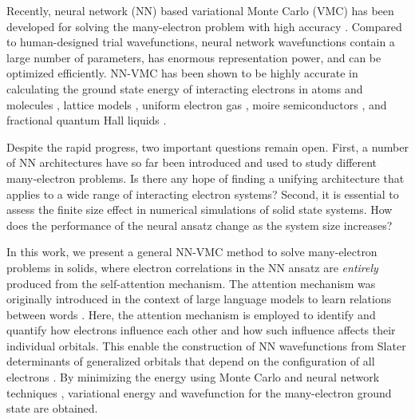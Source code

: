 \documentclass[
 reprint,
 amsmath,amssymb,
 aps, prx,
floatfix,longbibliography,
]{revtex4-2}
\begin{document}
Recently, neural network (NN) based variational Monte Carlo (VMC) has been developed for solving the many-electron problem with high accuracy   \cite{Carleo2017Feb,Schutt2017Dec,Carleo2019Jul,Luo_backflow,Choo2020May,PauliNet2020, Pfau2020Sep,vonGlehn2022Nov, viteritti2023transformer}. 
Compared to human-designed trial wavefunctions, neural network wavefunctions contain a large number of parameters, has enormous representation power, and can be optimized efficiently. NN-VMC has been shown to be highly accurate in calculating the ground state energy of interacting electrons in atoms and molecules \cite{PauliNet2020, Pfau2020Sep, vonGlehn2022Nov,Li2023JulForwardLaplacian,Gao2023Jul}, lattice models \cite{Carleo2019Jul,Moreno2022,viteritti2023transformer,Luo2023Mar,ChenJ1J22024},
uniform electron gas \cite{FerminetSolid2023, Wilson2023Jun, Luo2023,Kim2024May,Smith2024,pescia2023message,sobral2024physics},
moire semiconductors \cite{Li2024,Luo2024},
and fractional quantum Hall liquids \cite{Teng2024Nov,Qian2024}.  


Despite the rapid progress, two important questions remain open.  
First, a number of NN architectures have so far been introduced and used to study different many-electron problems.  
Is there any hope of finding a unifying architecture that applies to a wide range of interacting electron systems?
Second, it is essential to assess the finite size effect in numerical simulations of solid state systems.  
How does the performance of the neural ansatz change as the system size increases?


In this work, we present a general NN-VMC method to solve many-electron problems in solids, where electron correlations in the NN ansatz are {\it entirely} produced from the self-attention mechanism.
The attention mechanism was originally introduced in the context of large language models to learn relations between words \cite{transformer}. 
%
Here, the attention mechanism is employed to identify and quantify 
how electrons influence each other and how such influence affects their individual orbitals. 
%
This enable the construction of NN wavefunctions from Slater determinants of generalized orbitals that depend on the configuration of all electrons \cite{vonGlehn2022Nov}.  
By minimizing the energy using Monte Carlo and neural network techniques \cite{Foulkes2001Jan}, variational energy and wavefunction for the many-electron ground state are obtained.    
\end{document}
